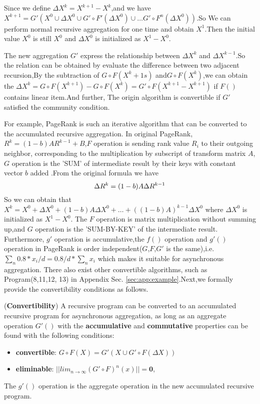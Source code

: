 Since we define $\Delta X^k=X^{k+1}-X^{k}$,and we have $X^{k+1}=G'(X^0\cup \Delta X^0 \cup G'\circ F'(\Delta X^0)\cup \ldots G' \circ F^n(\Delta X^0))$.So We can perform normal recursive aggregation for one time and obtain $X^1$.Then the initial value $X^0$ is still $X^0$ and $\Delta X^0$ is initialized as $X^1-X^0$.

The new aggregation $G'$ express the relationship between $\Delta X^k$ and $\Delta X^{k-1}$.So the relation can be obtained by evaluate the difference between two adjacent recursion,By the subtraction of $G\circ F(X^k+1s)$ and$G\circ F(X^{k})$,we can obtain the $\Delta X^{k}=G\circ F(X^{k+1})-G\circ F(X^{k})=G'\circ F(X^{k+1}-X^{k+1})$ if $F()$contains linear item.And further, The origin algorithm is convertible if $G'$ satisfied the community condition.

For example, PageRank is such an iterative algorithm that can be converted to the accumulated recursive aggregation. %
In original PageRank,$R^k=(1-b)AR^{k-1}+B$,$F$ operation is sending rank value $R_i$ to their outgoing neighbor, corresponding to the multiplication by subscript of transform matrix $A$,$G$ operation is the 'SUM' of intermediate result by their keys with constant vector $b$ added .From the original formula we have
\begin{equation}
\Delta R^k=(1-b)A\Delta R^{k-1}\notag
\end{equation}
So we can obtain that $X^k=X^0+\Delta X^0+(1-b)A\Delta X^0+\ldots+((1-b)A)^{k-1}\Delta X^0$
where $\Delta X^0$ is initialized as $X^1-X^0$. The $F$ operation is matrix multiplication without summing up,and $G$ operation is the 'SUM-BY-KEY' of the intermediate result.
Furthermore, $g'$ operation is accumulative,the $f()$ operation and $g'()$ operation in PageRank is order independent($G$,$F$,$G'$ is the same),i.e.$\sum_{n}{0.8*x_i/d}=0.8/d*\sum_{n}{x_i}$ which makes it suitable for asynchronous aggregation. There also exist other convertible algorithms, such as Program(8,11,12,
13) in Appendix Sec. \ref{sec:app:example}.Next,we formally provide the convertibility conditions as follows.

\begin{theorem}
	\label{th:convert}
	(\textbf{Convertibility}) A recursive program can be converted to an accumulated recursive program for asynchronous aggregation, as long as an aggregate operation $G'()$ with the \textbf{accumulative} and \textbf{commutative} properties can be found with the following conditions:\\
	\begin{itemize}
		\item \textbf{convertible}: $G\circ F(X)=G'(X\cup G'\circ F(\Delta X))$
\item \textbf{eliminable}: $\vert\vert lim_{n\rightarrow\infty}(G'\circ F)^n(x)\vert\vert=\textbf{0}$,
	\end{itemize}
	 The $g'()$ operation is the aggregate operation in the new accumulated recursive program.
\end{theorem}

